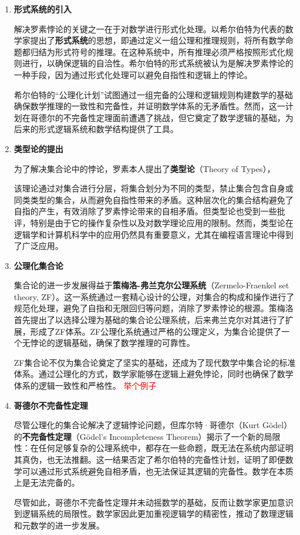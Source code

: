 \begin{enumerate}
\item {\bf 形式系统的引入}

解决罗素悖论的关键之一在于对数学进行形式化处理。以希尔伯特为代表的数学家提出了{\bf 形式系统}的思想，即通过定义一组公理和推理规则，将所有数学命题都归结为形式符号的推理。在这种系统中，所有推理必须严格按照形式化规则进行，以确保逻辑的自洽性。希尔伯特的形式系统被认为是解决罗素悖论的一种手段，因为通过形式化处理可以避免自指性和逻辑上的悖论。

希尔伯特的“公理化计划”试图通过一组完备的公理和逻辑规则构建数学的基础确保数学推理的一致性和完备性，并证明数学体系的无矛盾性。然而，这一计划在哥德尔的不完备性定理面前遭遇了挑战，但它奠定了数学逻辑的基础，为后来的形式逻辑系统和数学结构提供了工具。

\item {\bf 类型论的提出}

为了解决集合论中的悖论，罗素本人提出了{\bf 类型论}（Theory of Types），

该理论通过对集合进行分层，将集合划分为不同的类型，禁止集合包含自身或同类类型的集合，从而避免自指性带来的矛盾。这种层次化的集合结构避免了自指的产生，有效消除了罗素悖论带来的自相矛盾。但类型论也受到一些批评，特别是由于它的操作复杂性以及对数学理论应用的限制。然而，类型论在逻辑学和计算机科学中的应用仍然具有重要意义，尤其在编程语言理论中得到了广泛应用。

\item {\bf 公理化集合论}

集合论的进一步发展得益于{\bf 策梅洛-弗兰克尔公理系统}（Zermelo-Fraenkel set theory, ZF）。这一系统通过一套精心设计的公理，对集合的构成和操作进行了规范化处理，避免了自指和无限回归等问题，消除了罗素悖论的根源。策梅洛首先提出了以选择公理为基础的集合论公理系统，后来弗兰克尔对其进行了扩展，形成了ZF体系。ZF公理化系统通过严格的公理定义，为集合论提供了一个无悖论的逻辑基础，确保了数学推理的可靠性。

ZF集合论不仅为集合论奠定了坚实的基础，还成为了现代数学中集合论的标准体系。通过公理化的方式，数学家能够在逻辑上避免悖论，同时也确保了数学体系的逻辑一致性和严格性。
\textcolor{red}{举个例子}

\item {\bf 哥德尔不完备性定理}

尽管公理化的集合论解决了逻辑悖论问题，但库尔特·哥德尔（Kurt Gödel）的{\bf 不完备性定理}（Gödel's Incompleteness Theorem）揭示了一个新的局限性：在任何足够复杂的公理系统中，都存在一些命题，既无法在系统内部证明其真伪，也无法推翻。这一结果否定了希尔伯特的完备性计划，证明了即便数学可以通过形式系统避免自相矛盾，也无法保证其逻辑的完备性。数学在本质上是无法完备的。

尽管如此，哥德尔不完备性定理并未动摇数学的基础，反而让数学家更加意识到逻辑系统的局限性。数学家因此更加重视逻辑学的精密性，推动了数理逻辑和元数学的进一步发展。
\end{enumerate}

